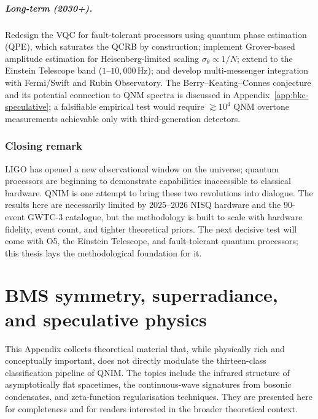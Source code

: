 \documentclass[11pt,a4paper, english]{book}
\theoremstyle{plain}
\theoremstyle{definition}
\numberwithin{equation}{chapter}
\numberwithin{figure}{chapter}
\numberwithin{table}{chapter}
\begin{document}
\paragraph{Long-term (2030+).}
\label{subsec:future-long}
Redesign the VQC for fault-tolerant processors using quantum phase estimation
(QPE), which saturates the QCRB by construction; implement Grover-based
amplitude estimation for Heisenberg-limited scaling $\sigma_\theta\propto1/N$;
extend to the Einstein Telescope band ($1$--$10{,}000$\,Hz); and develop
multi-messenger integration with Fermi/Swift and Rubin Observatory.
The Berry--Keating--Connes conjecture \cite{Berry_Keating_1999,Connes_1999}
and its potential connection to QNM spectra is discussed in
Appendix~\ref{app:bkc-speculative}; a falsifiable empirical test would require
$\gtrsim10^4$ QNM overtone measurements achievable only with
third-generation detectors.

\subsection{Closing remark}
\label{subsec:closing}

LIGO has opened a new observational window on the universe; quantum
processors are beginning to demonstrate capabilities inaccessible to
classical hardware. QNIM is one attempt to bring these two revolutions
into dialogue. The results here are necessarily limited by 2025--2026
NISQ hardware and the 90-event GWTC-3 catalogue, but the methodology is
built to scale with hardware fidelity, event count, and tighter
theoretical priors. The next decisive test will come with O5, the
Einstein Telescope, and fault-tolerant quantum processors; this thesis
lays the methodological foundation for it.

\appendix


\chapter{BMS symmetry, superradiance, and speculative physics}
\label{app:bms-superad}

This Appendix collects theoretical material that, while physically rich and conceptually important, does not directly modulate the thirteen-class classification pipeline of QNIM. The topics include the infrared structure of asymptotically flat spacetimes, the continuous-wave signatures from bosonic condensates, and zeta-function regularisation techniques. They are presented here for completeness and for readers interested in the broader theoretical context.
\end{document}
